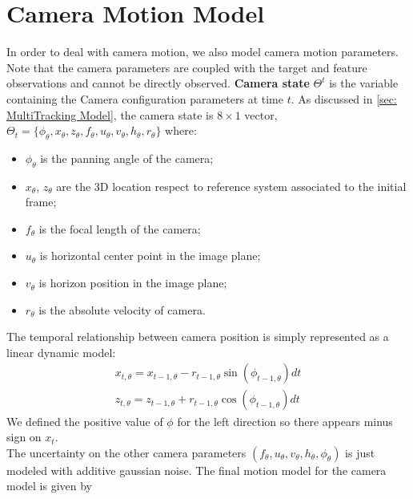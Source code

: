 \section{Camera Motion Model}
In order to deal with camera motion, we also model camera motion parameters. Note that the camera parameters are coupled with the target and feature observations and cannot be directly observed.  
\textbf{Camera state} $\Theta^{t}$ is the variable containing the Camera configuration parameters at time $t$. As discussed in \ref{sec: MultiTracking Model}, the camera state is $8\times1$ vector, $\Theta_{t}=\{\phi_{\theta}, x_{\theta}, z_{\theta}, f_{\theta}, u_{\theta}, v_{\theta}, h_{\theta},r_{\theta} \}$ where:
\begin{itemize}
\item $\phi_{\theta}$ is the panning angle of the camera;
\item $x_{\theta}$, $z_{\theta}$ are the 3D location respect to reference system associated to the initial frame;
\item $f_{\theta}$ is the focal length of the camera;
\item $u_{\theta}$ is horizontal center point in the image plane;
\item $v_{\theta}$ is horizon position  in the image plane;
\item $r_{\theta}$ is the absolute velocity of camera.
\end{itemize}
The temporal relationship between camera position is simply represented as a linear dynamic model:
\begin{eqnarray} \label{eqn: camera dynamics}
x_{t,\theta} = x_{t-1,\theta} - r_{t-1,\theta} \sin(\phi_{t-1,\theta} )dt \\
z_{t,\theta} = z_{t-1,\theta} + r_{t-1,\theta} \cos(\phi_{t-1,\theta} )dt
\end{eqnarray}
We defined the positive value of $\phi$ for the left direction so there appears minus
sign on $x_t$.\\
The uncertainty on the other camera parameters $( f_{\theta}, u_{\theta}, v_{\theta}, h_{\theta}, \phi_{\theta})$ is just modeled with additive gaussian noise. The final motion model for the camera model is given by
